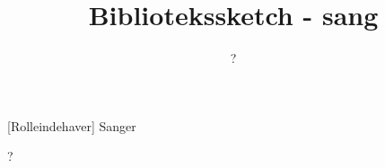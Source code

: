 \documentclass[a4paper,11pt]{article}
\title{Bibliotekssketch - sang}
\author{?}
\begin{document}
\maketitle

\begin{roles}  
[Rolleindehaver] Sanger
\end{roles}

?
\end{document}
